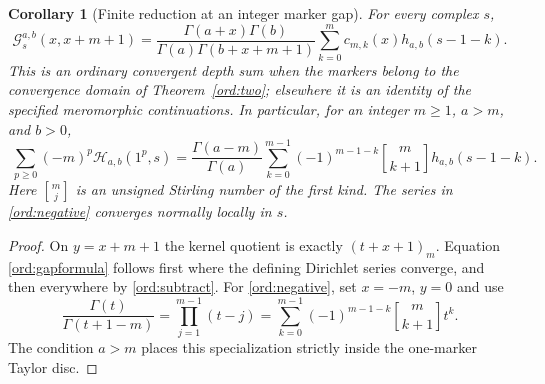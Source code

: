 \documentclass[11pt,a4paper]{article}
\numberwithin{equation}{section}
\newtheorem{corollary}[theorem]{Corollary}
\theoremstyle{definition}
\theoremstyle{remark}
\newcommand{\Hrel}{\mathcal H}
\begin{document}
\begin{corollary}[Finite reduction at an integer marker gap]
\label{ord:gap}
For every complex $s$,
\begin{equation}\label{ord:gapformula}
 \mathscr G_s^{a,b}(x,x+m+1)=
 \frac{\Gamma(a+x)\Gamma(b)}
      {\Gamma(a)\Gamma(b+x+m+1)}
       \sum_{k=0}^m c_{m,k}(x)h_{a,b}(s-1-k).
\end{equation}
This is an ordinary convergent depth sum when the markers belong to the
convergence domain of Theorem~\ref{ord:two}; elsewhere it is an identity
of the specified meromorphic continuations.
In particular, for an integer $m\ge1$, $a>m$, and $b>0$,
\begin{equation}\label{ord:negative}
 \boxed{\;
 \sum_{p\ge0}(-m)^p\Hrel_{a,b}(1^p,s)
 =\frac{\Gamma(a-m)}{\Gamma(a)}
    \sum_{k=0}^{m-1}(-1)^{m-1-k}
           \genfrac{[}{]}{0pt}{}{m}{k+1}h_{a,b}(s-1-k).
 \;}
\end{equation}
Here $\genfrac{[}{]}{0pt}{}{m}{j}$ is an unsigned Stirling number of the
first kind.  The series in \eqref{ord:negative} converges normally
locally in $s$.
\end{corollary}

\begin{proof}
On $y=x+m+1$ the kernel quotient is exactly $(t+x+1)_m$.
Equation \eqref{ord:gapformula} follows first where the defining
Dirichlet series converge, and then everywhere by
\eqref{ord:subtract}.  For \eqref{ord:negative}, set $x=-m$, $y=0$
and use
\[
 \frac{\Gamma(t)}{\Gamma(t+1-m)}
   =\prod_{j=1}^{m-1}(t-j)
   =\sum_{k=0}^{m-1}(-1)^{m-1-k}
                      \genfrac{[}{]}{0pt}{}{m}{k+1}t^k.
\]
The condition $a>m$ places this specialization strictly inside the
one-marker Taylor disc.
\end{proof}
\end{document}
